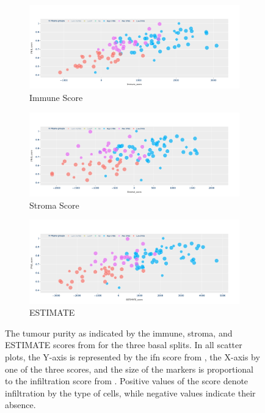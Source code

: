 \begin{figure}[!htb]
    \centering
    \begin{subfigure}[!t]{0.49\textwidth}
        \includegraphics[width=\textwidth,keepaspectratio]{Sections/ClusteringAnalysis/Resources/discussion/Immune_spectrum.png}    
        \caption{Immune Score}
        \label{fig:cs:immune_basal}
    \end{subfigure}
    \centering
    \begin{subfigure}[!t]{0.49\textwidth}
        \includegraphics[width=\textwidth,keepaspectratio]{Sections/ClusteringAnalysis/Resources/discussion/Stroma_spectrum.png}
        \caption{Stroma Score}
        \label{fig:cs:stroma_basal}
    \end{subfigure} 
    \centering
    \begin{subfigure}[!t]{0.7\textwidth}
        \includegraphics[width=\textwidth,keepaspectratio]{Sections/ClusteringAnalysis/Resources/discussion/Estimate_spectrum.png}
        \caption{ESTIMATE}
        \label{fig:cs:estimate_basal}
    \end{subfigure}
    \centering
    \caption{The tumour purity as indicated by the immune, stroma, and ESTIMATE scores from \citet{Yoshihara2013-wq} for the three basal splits. In all scatter plots, the Y-axis is represented by the \acrshort{ifn} score from \citet{Baker2022-bj}, the X-axis by one of the three scores, and the size of the markers is proportional to the infiltration score from \citet{Robertson2017-mg}. Positive values of the score denote infiltration by the type of cells, while negative values indicate their absence.}
    \label{fig:cs:tumour_purity}
\end{figure}


